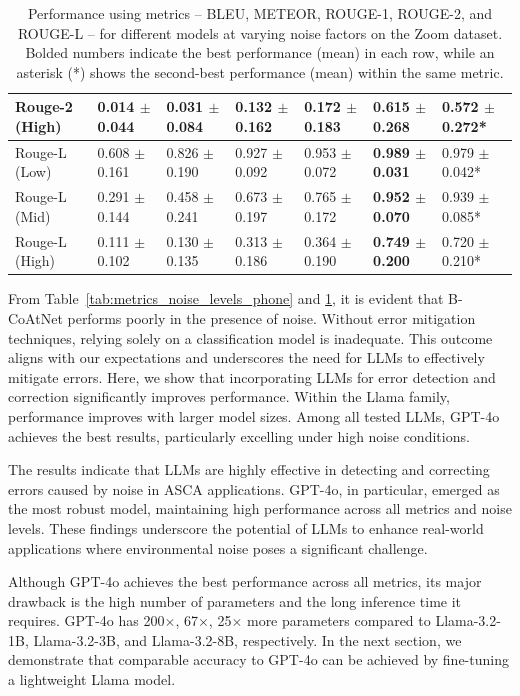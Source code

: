 \begin{table}[htbp]
\begin{tabular}{l|p{2cm}p{2cm}p{2cm}p{2cm}p{2cm}p{2cm}}
        Rouge-2 (High) & 0.014 $\pm$ 0.044 & 0.031 $\pm$ 0.084 & 0.132 $\pm$ 0.162 & 0.172 $\pm$ 0.183 & \textbf{0.615 $\pm$ 0.268} & 0.572 $\pm$ 0.272* \\
        \midrule
        Rouge-L (Low) & 0.608 $\pm$ 0.161 & 0.826 $\pm$ 0.190 & 0.927 $\pm$ 0.092 & 0.953 $\pm$ 0.072 & \textbf{0.989 $\pm$ 0.031} & 0.979 $\pm$ 0.042* \\
        Rouge-L (Mid) & 0.291 $\pm$ 0.144 & 0.458 $\pm$ 0.241 & 0.673 $\pm$ 0.197 & 0.765 $\pm$ 0.172 & \textbf{0.952 $\pm$ 0.070} & 0.939 $\pm$ 0.085* \\
        Rouge-L (High) & 0.111 $\pm$ 0.102 & 0.130 $\pm$ 0.135 & 0.313 $\pm$ 0.186 & 0.364 $\pm$ 0.190 & \textbf{0.749 $\pm$ 0.200} & 0.720 $\pm$ 0.210* \\
        \bottomrule
    \end{tabular}
    \vspace{0.2em}
    \caption{Performance using metrics -- BLEU, METEOR, ROUGE-1, ROUGE-2, and ROUGE-L -- for different models at varying noise factors on the Zoom dataset. Bolded numbers indicate the best performance (mean) in each row, while an asterisk (*) shows the second-best performance (mean) within the same metric.}
    \label{tab:metrics_noise_levels_zoom}
\end{table}
From Table~\ref{tab:metrics_noise_levels_phone} and \ref{tab:metrics_noise_levels_zoom}, it is evident that B-CoAtNet performs poorly in the presence of noise. Without error mitigation techniques, relying solely on a classification model is inadequate.  
This outcome aligns with our expectations and underscores the need for LLMs to effectively mitigate errors.
Here, we show that incorporating LLMs for error detection and correction significantly improves performance. 
Within the Llama family, performance improves with larger model sizes. Among all tested LLMs, GPT-4o achieves the best results, particularly excelling under high noise conditions. 
\par 
The results indicate that LLMs are highly effective in detecting and correcting errors caused by noise in ASCA applications. GPT-4o, in particular, emerged as the most robust model, maintaining high performance across all metrics and noise levels. These findings underscore the potential of LLMs to enhance real-world applications where environmental noise poses a significant challenge.
\par 
Although GPT-4o achieves the best performance across all metrics, its major drawback is the high number of parameters and the long inference time it requires. GPT-4o has 200$\times$, 67$\times$, 25$\times$ more parameters compared to Llama-3.2-1B, Llama-3.2-3B, and Llama-3.2-8B, respectively. In the next section, we demonstrate that comparable accuracy to GPT-4o can be achieved by fine-tuning a lightweight Llama model.

